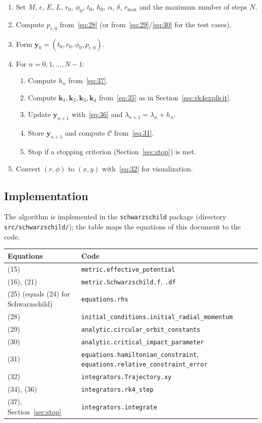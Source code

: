 \documentclass[11pt,a4paper]{article}
\begin{document}
\begin{enumerate}
  \item Set $M$, $\epsilon$, $E$, $L$, $r_0$, $\phi_0$, $t_0$, $h_0$, $\alpha$, $\delta$, $r_{\text{max}}$ and the maximum number of steps $N$.
  \item Compute $p_{r,0}$ from~\eqref{eq:28} (or from~\eqref{eq:29}/\eqref{eq:30} for the test cases).
  \item Form $\mathbf{y}_0 = (t_0, r_0, \phi_0, p_{r,0})$.
  \item For $n = 0, 1, \ldots, N-1$:
  \begin{enumerate}
    \item Compute $h_n$ from~\eqref{eq:37}.
    \item Compute $\mathbf{k}_1, \mathbf{k}_2, \mathbf{k}_3, \mathbf{k}_4$ from~\eqref{eq:35} as in Section~\ref{sec:rk4explicit}.
    \item Update $\mathbf{y}_{n+1}$ with~\eqref{eq:36} and $\lambda_{n+1} = \lambda_n + h_n$.
    \item Store $\mathbf{y}_{n+1}$ and compute $\mathcal{C}$ from~\eqref{eq:31}.
    \item Stop if a stopping criterion (Section~\ref{sec:stop}) is met.
  \end{enumerate}
  \item Convert $(r, \phi)$ to $(x, y)$ with~\eqref{eq:32} for visualization.
\end{enumerate}

\subsection{Implementation}

The algorithm is implemented in the \texttt{schwarzschild} package (directory \texttt{src/schwarzschild/}); the table maps the equations of this document to the code.

\begin{center}
\begin{tabular}{@{}l>{\raggedright\arraybackslash}p{9.3cm}@{}}
\toprule
Equations & Code \\
\midrule
(15) & \texttt{metric.effective\_potential} \\
(16), (21) & \texttt{metric.Schwarzschild.f}, \texttt{.df} \\
(25) (equals (24) for Schwarzschild) & \texttt{equations.rhs} \\
(28) & \texttt{initial\_conditions.initial\_radial\_momentum} \\
(29) & \texttt{analytic.circular\_orbit\_constants} \\
(30) & \texttt{analytic.critical\_impact\_parameter} \\
(31) & \texttt{equations.hamiltonian\_constraint}, \texttt{equations.relative\_constraint\_error} \\
(32) & \texttt{integrators.Trajectory.xy} \\
(34), (36) & \texttt{integrators.rk4\_step} \\
(37), Section~\ref{sec:stop} & \texttt{integrators.integrate} \\
\bottomrule
\end{tabular}
\end{center}
\end{document}
